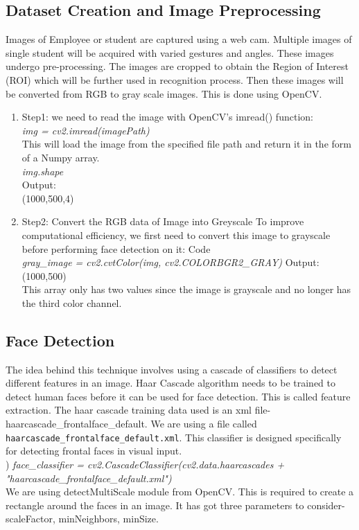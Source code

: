   \subsection{Dataset Creation and Image Preprocessing}
  
 Images of Employee or student are captured using a web cam. Multiple images of single student will be acquired with varied gestures and  angles.  These  images  undergo  pre-processing.  The images  are cropped  to obtain  the  Region of  Interest (ROI) which will be further used in recognition process. Then these  images  will  be  converted  from  RGB  to  gray  scale images. This is done using OpenCV. 
\begin{enumerate}
    \item Step1: we need to read the image with OpenCV’s imread() function:
    \\
  \emph{img = cv2.imread(imagePath)} \\
    This will load the image from the specified file path and return it in the form of a Numpy array. \\
   \emph{img.shape} \\
    Output:\\
    (1000,500,4)
    \item Step2: Convert the RGB data of Image into Greyscale
    To improve computational efficiency, we first need to convert this image to grayscale before performing face detection on it:
    Code \\
   \emph{gray\_image = cv2.cvtColor(img, cv2.COLORBGR2\_GRAY)} 
    Output:
    \\
    (1000,500)\\
    This array only has two values since the image is grayscale and no longer has the third color channel.
\end{enumerate}

  \subsection{Face Detection}
  The idea behind this technique involves using a cascade of classifiers to detect different features in an image. Haar Cascade algorithm needs to be trained to  detect human  faces before it can be used for  face detection. This is called feature extraction. The haar cascade training  data  used  is  an  xml  file- haarcascade\_frontalface\_default. We are using a file called \verb|haarcascade_frontalface_default.xml|. This classifier is designed specifically for detecting frontal faces in visual input.
  \\
)
   \emph{   face\_classifier = cv2.CascadeClassifier(cv2.data.haarcascades + "haarcascade\_frontalface\_default.xml")}
\\
  We are using detectMultiScale module from OpenCV. This is required to create a rectangle around  the faces  in an image.  It has got three  parameters to  consider-  scaleFactor, minNeighbors, minSize.

